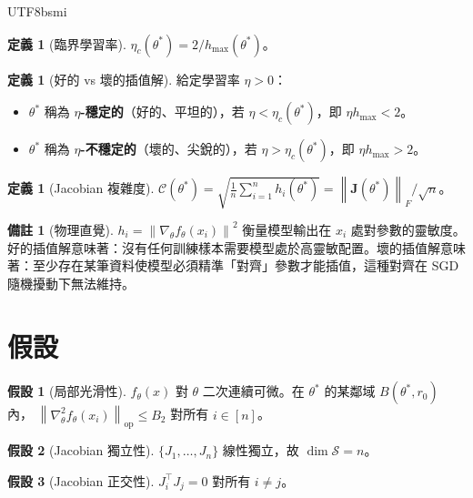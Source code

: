 \documentclass[11pt,a4paper]{article}
\theoremstyle{definition}
\newtheorem{definition}[theorem]{定義}
\newtheorem{assumption}{假設}
\newtheorem{remark}[theorem]{備註}
\newcommand{\cS}{\mathcal{S}}
\newcommand{\cC}{\mathcal{C}}
\newcommand{\bJ}{\mathbf{J}}
\newcommand{\norm}[1]{\left\|#1\right\|}
\begin{document}
\begin{CJK}{UTF8}{bsmi}
\begin{definition}[臨界學習率]\label{def:eta-c}
  $\eta_c(\theta^*)=2/h_{\max}(\theta^*)$。
\end{definition}

\begin{definition}[好的 vs 壞的插值解]\label{def:good-bad}
  給定學習率 $\eta>0$：
  \begin{itemize}
    \item $\theta^*$ 稱為 \textbf{$\eta$-穩定的}（好的、平坦的），若 $\eta<\eta_c(\theta^*)$，即 $\eta h_{\max}<2$。
    \item $\theta^*$ 稱為 \textbf{$\eta$-不穩定的}（壞的、尖銳的），若 $\eta>\eta_c(\theta^*)$，即 $\eta h_{\max}>2$。
  \end{itemize}
\end{definition}

\begin{definition}[Jacobian 複雜度]\label{def:jac-complex}
  $\cC(\theta^*)=\sqrt{\frac{1}{n}\sum_{i=1}^n h_i(\theta^*)}=\norm{\bJ(\theta^*)}_F/\sqrt{n}$。
\end{definition}

\begin{remark}[物理直覺]
  $h_i=\norm{\nabla_\theta f_\theta(x_i)}^2$ 衡量模型輸出在 $x_i$ 處對參數的靈敏度。好的插值解意味著：沒有任何訓練樣本需要模型處於高靈敏配置。壞的插值解意味著：至少存在某筆資料使模型必須精準「對齊」參數才能插值，這種對齊在 SGD 隨機擾動下無法維持。
\end{remark}

\section{假設}

\begin{assumption}[局部光滑性]\label{A:smooth}
  $f_\theta(x)$ 對 $\theta$ 二次連續可微。在 $\theta^*$ 的某鄰域 $B(\theta^*,r_0)$ 內，
  $\norm{\nabla^2_\theta f_\theta(x_i)}_{\mathrm{op}}\leq B_2$ 對所有 $i\in[n]$。
\end{assumption}

\begin{assumption}[Jacobian 獨立性]\label{A:indep}
  $\{J_1,\ldots,J_n\}$ 線性獨立，故 $\dim\cS=n$。
\end{assumption}

\begin{assumption}[Jacobian 正交性]\label{A:orth}
  $J_i^\top J_j=0$ 對所有 $i\neq j$。
\end{assumption}


\end{CJK}
\end{document}

